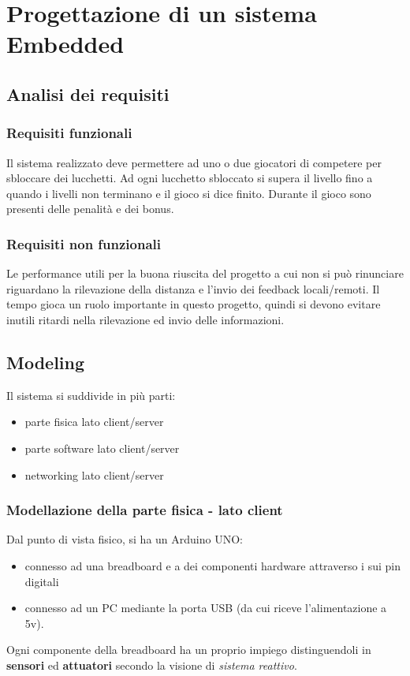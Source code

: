 \chapter{Progettazione di un sistema Embedded}
\section{Analisi dei requisiti}
\subsection{Requisiti funzionali}
Il sistema realizzato deve permettere ad uno o due giocatori di competere per sbloccare dei lucchetti. Ad ogni lucchetto sbloccato si supera il livello fino a quando i livelli non terminano e il gioco si dice finito. Durante il gioco sono presenti delle penalità e dei bonus.

\subsection{Requisiti non funzionali}
Le performance utili per la buona riuscita del progetto a cui non si può rinunciare riguardano la rilevazione della distanza e l'invio dei feedback locali/remoti.
Il tempo gioca un ruolo importante in questo progetto, quindi si devono evitare inutili ritardi nella rilevazione ed invio delle informazioni.

\section{Modeling}
Il sistema si suddivide in più parti:
\begin{itemize}
	\item parte fisica lato client/server
	\item parte software lato client/server
	\item networking lato client/server
\end{itemize}

\subsection{Modellazione della parte fisica - lato client}
Dal punto di vista fisico, si ha un Arduino UNO:
 \begin{itemize}
 	\item connesso ad una breadboard e a dei componenti hardware attraverso i sui pin digitali
 	\item connesso ad un PC mediante la porta USB (da cui riceve l'alimentazione a 5v). 
 \end{itemize}
 Ogni componente della breadboard ha un proprio impiego distinguendoli in \textbf{sensori} ed \textbf{attuatori} secondo la visione di \textit{sistema reattivo}.

